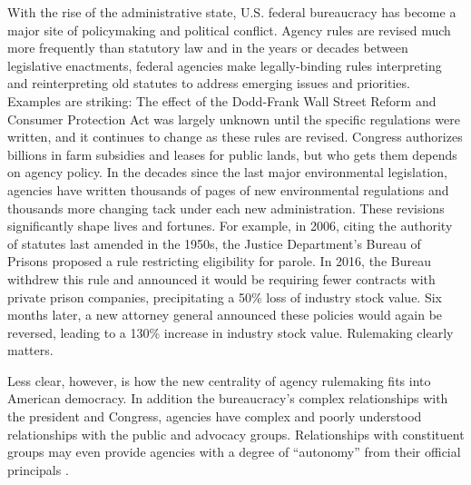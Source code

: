 With the rise of the administrative state, U.S. federal bureaucracy has become a major site of policymaking and political conflict. Agency rules are revised much more frequently than statutory law \citep{Wagner2017} and in the years or decades between legislative enactments, federal agencies make legally-binding rules interpreting and reinterpreting old statutes to address emerging issues and priorities. %
Examples are striking: The effect of the Dodd-Frank Wall Street Reform and Consumer Protection Act was largely unknown until the specific regulations were written, and it continues to change as these rules are revised. 
Congress authorizes billions in farm subsidies and leases for public lands, but who gets them depends on agency policy. In the decades since the last major environmental legislation, agencies have written thousands of pages of new environmental regulations and thousands more changing tack under each new administration. These revisions significantly shape lives and fortunes. For example, in 2006, citing the authority of statutes last amended in the 1950s, the Justice Department's Bureau of Prisons proposed a rule restricting eligibility for parole. In 2016, the Bureau withdrew this rule and announced it would be requiring fewer contracts with private prison companies, precipitating a 50\% loss of industry stock value. Six months later, a new attorney general announced these policies would again be reversed, leading to a 130\% increase in industry stock value. %
Rulemaking clearly matters.

Less clear, however, is how the new centrality of agency rulemaking fits into American democracy. In addition the bureaucracy's complex relationships with the president and Congress, agencies have complex and poorly understood relationships with the public and advocacy groups. Relationships with constituent groups may even provide agencies with a degree of ``autonomy'' from their official principals \citep{Carpenter2001}. 

